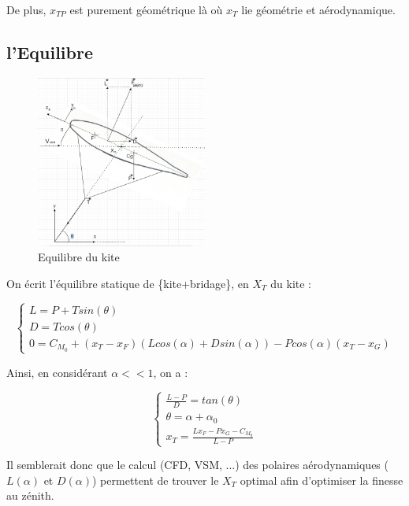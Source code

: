 \documentclass[conference]{IEEEtran}
\begin{document}
De plus, $x_{TP}$ est purement géométrique là où $x_T$ lie géométrie et aérodynamique.

\subsection{l'Equilibre} 

\begin{figure}[H]
    \centering
    \includegraphics[width=0.5\textwidth]{Pics/Equilibre Kite.png}  
    \caption{Equilibre du kite}
    \label{fig:Equilibre du kite}
\end{figure}

On écrit l'équilibre statique de \{kite+bridage\}, en $X_T$ du kite : 

\begin{equation}
    \begin{cases}
        L = P + T sin(\theta) \\
        D = T cos(\theta) \\
        0 = C_{M_0} + (x_T - x_F) (L cos(\alpha) + D sin(\alpha)) - P cos(\alpha) (x_T - x_G)
    \end{cases}
\end{equation}

Ainsi, en considérant $\alpha << 1$, on a :

\begin{equation}
    \begin{cases}
    \frac{L-P}{D} = tan(\theta) \\
    \theta = \alpha + \alpha_0 \\
    x_T = \frac{L x_F - P x_G -C_{M_0}}{L - P}
    \end{cases}
    \label{eq:Xt}
\end{equation}
    
Il semblerait donc que le calcul (CFD, VSM, ...) des polaires aérodynamiques ($L(\alpha)$ et $D(\alpha)$) permettent de trouver le $X_T$ optimal afin d'optimiser la finesse au zénith. 
\end{document}
